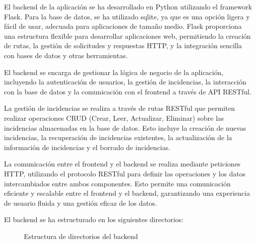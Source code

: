 \documentclass{article}
\begin{document}
El backend de la aplicación se ha desarrollado en Python utilizando el framework Flask. Para la base de datos, se ha utilizado sqlite, ya que es una opción ligera y fácil de usar, adecuada para aplicaciones de tamaño medio. Flask proporciona una estructura flexible para desarrollar aplicaciones web, permitiendo la creación de rutas, la gestión de solicitudes y respuestas HTTP, y la integración sencilla con bases de datos y otras herramientas.

El backend se encarga de gestionar la lógica de negocio de la aplicación, incluyendo la autenticación de usuarios, la gestión de incidencias, la interacción con la base de datos y la comunicación con el frontend a través de API RESTful.

La gestión de incidencias se realiza a través de rutas RESTful que permiten realizar operaciones CRUD (Crear, Leer, Actualizar, Eliminar) sobre las incidencias almacenadas en la base de datos. Esto incluye la creación de nuevas incidencias, la recuperación de incidencias existentes, la actualización de la información de incidencias y el borrado de incidencias.

La comunicación entre el frontend y el backend se realiza mediante peticiones HTTP, utilizando el protocolo RESTful para definir las operaciones y los datos intercambiados entre ambos componentes. Esto permite una comunicación eficiente y escalable entre el frontend y el backend, garantizando una experiencia de usuario fluida y una gestión eficaz de los datos.

El backend se ha estructurado en los siguientes directorios:

\begin{figure}[H]
    \centering
    \begin{minipage}{0.4\textwidth}
    \end{minipage}
    \caption{Estructura de directorios del backend}
    \label{fig:estructura_directorios_backend}
\end{figure}
\end{document}
